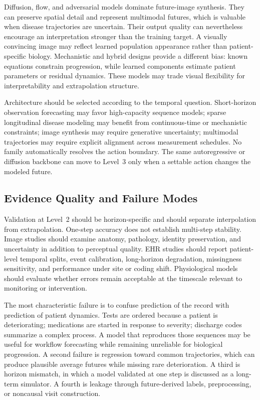 Diffusion, flow, and adversarial models dominate future-image synthesis. They can preserve spatial detail and represent multimodal futures, which is valuable when disease trajectories are uncertain. Their output quality can nevertheless encourage an interpretation stronger than the training target. A visually convincing image may reflect learned population appearance rather than patient-specific biology. Mechanistic and hybrid designs provide a different bias: known equations constrain progression, while learned components estimate patient parameters or residual dynamics. These models may trade visual flexibility for interpretability and extrapolation structure.

Architecture should be selected according to the temporal question. Short-horizon observation forecasting may favor high-capacity sequence models; sparse longitudinal disease modeling may benefit from continuous-time or mechanistic constraints; image synthesis may require generative uncertainty; multimodal trajectories may require explicit alignment across measurement schedules. No family automatically resolves the action boundary. The same autoregressive or diffusion backbone can move to Level~3 only when a settable action changes the modeled future.

\subsection{Evidence Quality and Failure Modes}

Validation at Level~2 should be horizon-specific and should separate interpolation from extrapolation. One-step accuracy does not establish multi-step stability. Image studies should examine anatomy, pathology, identity preservation, and uncertainty in addition to perceptual quality. EHR studies should report patient-level temporal splits, event calibration, long-horizon degradation, missingness sensitivity, and performance under site or coding shift. Physiological models should evaluate whether errors remain acceptable at the timescale relevant to monitoring or intervention.

The most characteristic failure is to confuse prediction of the record with prediction of patient dynamics. Tests are ordered because a patient is deteriorating; medications are started in response to severity; discharge codes summarize a complex process. A model that reproduces those sequences may be useful for workflow forecasting while remaining unreliable for biological progression. A second failure is regression toward common trajectories, which can produce plausible average futures while missing rare deterioration. A third is horizon mismatch, in which a model validated at one step is discussed as a long-term simulator. A fourth is leakage through future-derived labels, preprocessing, or noncausal visit construction.

